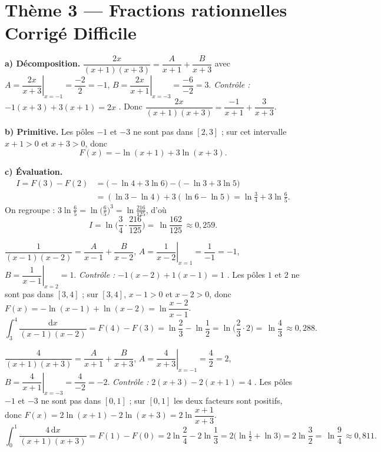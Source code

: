 \documentclass[11pt,a4paper]{article}
\newcommand{\dd}{\mathrm{d}}
\begin{document}
\section*{Thème 3 — Fractions rationnelles \quad\textbullet\quad Corrigé Difficile}

\begin{corr}[1]
\textbf{a) Décomposition.} $\dfrac{2x}{(x+1)(x+3)}=\dfrac{A}{x+1}+\dfrac{B}{x+3}$ avec
$A=\left.\dfrac{2x}{x+3}\right|_{x=-1}=\dfrac{-2}{2}=-1$,
$B=\left.\dfrac{2x}{x+1}\right|_{x=-3}=\dfrac{-6}{-2}=3$.
\emph{Contrôle :} $-1(x+3)+3(x+1)=2x$ \checkmark. Donc
$\dfrac{2x}{(x+1)(x+3)}=\dfrac{-1}{x+1}+\dfrac{3}{x+3}$.

\smallskip
\textbf{b) Primitive.} Les pôles $-1$ et $-3$ ne sont pas dans $[2,3]$ ; sur cet intervalle
$x+1>0$ et $x+3>0$, donc
\[
F(x)=-\ln(x+1)+3\ln(x+3).
\]

\smallskip
\textbf{c) Évaluation.}
\begin{align*}
I=F(3)-F(2)&=\bigl(-\ln4+3\ln6\bigr)-\bigl(-\ln3+3\ln5\bigr)\\
&=(\ln3-\ln4)+3(\ln6-\ln5)
=\ln\tfrac34+3\ln\tfrac65.
\end{align*}
On regroupe : $3\ln\tfrac65=\ln\bigl(\tfrac65\bigr)^3=\ln\tfrac{216}{125}$, d'où
\[
I=\ln\!\Big(\frac34\cdot\frac{216}{125}\Big)=\boxed{\,\ln\frac{162}{125}\,}\approx 0{,}259.
\]
\end{corr}

\begin{corr}[2]
$\dfrac{1}{(x-1)(x-2)}=\dfrac{A}{x-1}+\dfrac{B}{x-2}$,
$A=\left.\dfrac{1}{x-2}\right|_{x=1}=\dfrac{1}{-1}=-1$,
$B=\left.\dfrac{1}{x-1}\right|_{x=2}=1$.
\emph{Contrôle :} $-1(x-2)+1(x-1)=1$ \checkmark.
Les pôles $1$ et $2$ ne sont pas dans $[3,4]$ ; sur $[3,4]$, $x-1>0$ et $x-2>0$, donc
$F(x)=-\ln(x-1)+\ln(x-2)=\ln\dfrac{x-2}{x-1}$.
\[
\int_{3}^{4}\frac{\dd x}{(x-1)(x-2)}=F(4)-F(3)=\ln\frac{2}{3}-\ln\frac{1}{2}
=\ln\!\Big(\frac23\cdot 2\Big)=\boxed{\,\ln\frac43\,}\approx 0{,}288.
\]
\end{corr}

\begin{corr}[3]
$\dfrac{4}{(x+1)(x+3)}=\dfrac{A}{x+1}+\dfrac{B}{x+3}$,
$A=\left.\dfrac{4}{x+3}\right|_{x=-1}=\dfrac42=2$,
$B=\left.\dfrac{4}{x+1}\right|_{x=-3}=\dfrac{4}{-2}=-2$.
\emph{Contrôle :} $2(x+3)-2(x+1)=4$ \checkmark.
Les pôles $-1$ et $-3$ ne sont pas dans $[0,1]$ ; sur $[0,1]$ les deux facteurs sont positifs,
donc $F(x)=2\ln(x+1)-2\ln(x+3)=2\ln\dfrac{x+1}{x+3}$.
\[
\int_{0}^{1}\frac{4\,\dd x}{(x+1)(x+3)}=F(1)-F(0)
=2\ln\frac{2}{4}-2\ln\frac{1}{3}
=2\Big(\ln\tfrac12+\ln 3\Big)=2\ln\frac32=\boxed{\,\ln\frac94\,}\approx 0{,}811.
\]
\end{corr}
\end{document}

